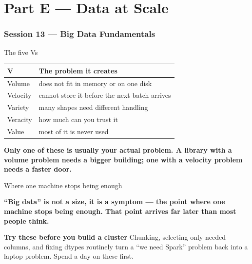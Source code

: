 \documentclass[10pt,aspectratio=169]{beamer}
\newcommand{\keyidea}[1]{%
  \begin{block}{}
  \centering\Large\bfseries\color{dsblue} #1
  \end{block}%
}
\newcommand{\trapbox}[2]{%
  \begin{alertblock}{\textbf{#1}}
  #2
  \end{alertblock}%
}
\begin{document}
\part{Part E --- Data at Scale}
\frame{\partpage}

\section{Session 13 --- Big Data Fundamentals}

\begin{frame}{The five Vs}
\begin{table}
\footnotesize
\begin{tabularx}{\linewidth}{@{}lX@{}}
\toprule
\textbf{V} & \textbf{The problem it creates} \\
\midrule
Volume & does not fit in memory or on one disk \\
Velocity & cannot store it before the next batch arrives \\
Variety & many shapes need different handling \\
Veracity & how much can you trust it \\
Value & most of it is never used \\
\bottomrule
\end{tabularx}
\end{table}
\keyidea{Only one of these is usually your actual problem. A library with a volume problem needs a bigger building; one with a velocity problem needs a faster door.}
\end{frame}

\begin{frame}{Where one machine stops being enough}
\keyidea{``Big data'' is not a size, it is a symptom --- the point where one machine stops being enough. That point arrives far later than most people think.}
\trapbox{Try these before you build a cluster}{Chunking, selecting only needed columns, and fixing dtypes routinely turn a ``we need Spark'' problem back into a laptop problem. Spend a day on these first.}
\end{frame}
\end{document}
